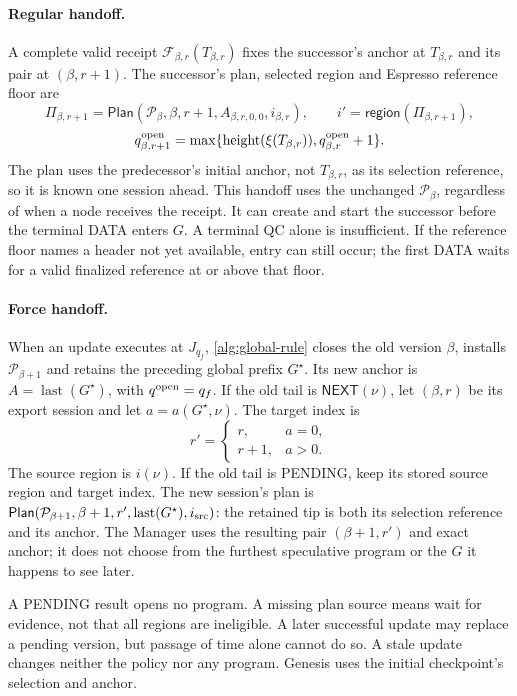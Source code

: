 \documentclass[11pt,a4paper]{article}
\newcommand{\FC}{\mathcal F}
\newcommand{\tagg}[1]{\ensuremath{\mathsf{#1}}}
\begin{document}
\paragraph{Regular handoff.}
A complete valid receipt $\FC_{\beta,r}(T_{\beta,r})$ fixes the
successor's anchor at $T_{\beta,r}$ and its pair at $(\beta,r+1)$.
The successor's plan, selected region and Espresso reference floor are
\[
 \Pi_{\beta,r+1}=\tagg{Plan}(\mathcal P_\beta,\beta,r+1,
 A_{\beta,r,0,0},i_{\beta,r}),\qquad
 i'=\tagg{region}(\Pi_{\beta,r+1}),
\]
\[
 q^{\rm open}_{\beta,r+1}
 =\max\{\operatorname{height}(\xi(T_{\beta,r})),
         q^{\rm open}_{\beta,r}+1\}.
\]
The plan uses the predecessor's initial anchor, not $T_{\beta,r}$, as its
selection reference, so it is known one session ahead. This handoff uses
the unchanged $\mathcal P_\beta$, regardless of when a node receives the
receipt.
It can create and start the successor before the terminal DATA enters
$G$. A terminal QC alone is insufficient. If the reference floor names
a header not yet available, entry can still occur; the first DATA waits
for a valid finalized reference at or above that floor.

\paragraph{Force handoff.}
\label{sec:retry-slot}
When an update executes at $J_{q_f}$, \cref{alg:global-rule} closes the
old version $\beta$, installs $\mathcal P_{\beta+1}$ and retains the preceding
global prefix $G^\star$. Its new anchor is
$A=\operatorname{last}(G^\star)$, with $q^{\rm open}=q_f$.
If the old tail is $\tagg{NEXT}(\nu)$, let $(\beta,r)$ be its export
session and let $a=a(G^\star,\nu)$. The target index is
\[
 r'=\begin{cases}
 r,&a=0,\\
 r+1,&a>0.
 \end{cases}
\]
The source region is $i(\nu)$. If the old tail is PENDING, keep its
stored source region and target index. The new session's plan is
$\tagg{Plan}(\mathcal P_{\beta+1},\beta+1,r',
\operatorname{last}(G^\star),i_{\rm src})$: the retained tip is both its
selection reference and its anchor. The Manager uses the resulting pair
$(\beta+1,r')$ and exact anchor; it does not choose from the furthest
speculative program or the $G$ it happens to see later.

A PENDING result opens no program. A missing plan source means wait for
evidence, not that all regions are ineligible. A later successful update
may replace a pending version, but passage of time alone cannot do so.
A stale update changes neither the policy nor any program.
Genesis uses the initial checkpoint's selection and anchor.
\end{document}
